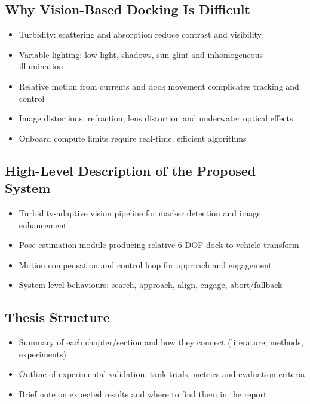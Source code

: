\subsection{Why Vision-Based Docking Is Difficult}
\begin{itemize}
	\item Turbidity: scattering and absorption reduce contrast and visibility
	\item Variable lighting: low light, shadows, sun glint and inhomogeneous illumination
	\item Relative motion from currents and dock movement complicates tracking and control
	\item Image distortions: refraction, lens distortion and underwater optical effects
	\item Onboard compute limits require real-time, efficient algorithms
\end{itemize}

\subsection{High-Level Description of the Proposed System}
\begin{itemize}
	\item Turbidity-adaptive vision pipeline for marker detection and image enhancement
	\item Pose estimation module producing relative 6-DOF dock-to-vehicle transform
	\item Motion compensation and control loop for approach and engagement
	\item System-level behaviours: search, approach, align, engage, abort/fallback
\end{itemize}

\subsection{Thesis Structure}
\begin{itemize}
	\item Summary of each chapter/section and how they connect (literature, methods, experiments)
	\item Outline of experimental validation: tank trials, metrics and evaluation criteria
	\item Brief note on expected results and where to find them in the report
\end{itemize}
